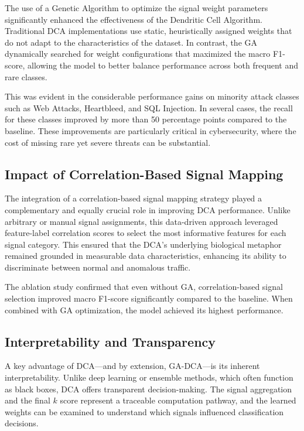 \documentclass[conference]{IEEEtran}
\begin{document}
The use of a Genetic Algorithm to optimize the signal weight
parameters significantly enhanced the effectiveness of the Dendritic
Cell Algorithm. Traditional DCA implementations use static,
heuristically assigned weights that do not adapt to the
characteristics of the dataset. In contrast, the GA dynamically
searched for weight configurations that maximized the macro F1-score,
allowing the model to better balance performance across both frequent
and rare classes.

This was evident in the considerable performance gains on minority
attack classes such as Web Attacks, Heartbleed, and SQL Injection. In
several cases, the recall for these classes improved by more than 50
percentage points compared to the baseline. These improvements are
particularly critical in cybersecurity, where the cost of missing
rare yet severe threats can be substantial.

\subsection{Impact of Correlation-Based Signal Mapping}

The integration of a correlation-based signal mapping strategy played
a complementary and equally crucial role in improving DCA
performance. Unlike arbitrary or manual signal assignments, this
data-driven approach leveraged feature-label correlation scores to
select the most informative features for each signal category. This
ensured that the DCA's underlying biological metaphor remained
grounded in measurable data characteristics, enhancing its ability to
discriminate between normal and anomalous traffic.

The ablation study confirmed that even without GA, correlation-based
signal selection improved macro F1-score significantly compared to
the baseline. When combined with GA optimization, the model achieved
its highest performance.

\subsection{Interpretability and Transparency}

A key advantage of DCA—and by extension, GA-DCA—is its inherent
interpretability. Unlike deep learning or ensemble methods, which
often function as black boxes, DCA offers transparent
decision-making. The signal aggregation and the final $k$ score
represent a traceable computation pathway, and the learned weights
can be examined to understand which signals influenced
classification decisions.
\end{document}
